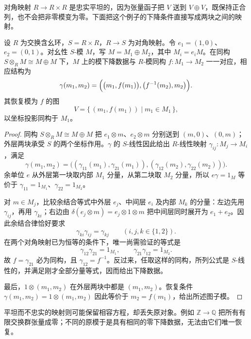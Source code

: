 对角映射 \(R\rightarrow R\times R\) 是忠实平坦的，因为张量函子把 \(V\) 送到 \(V\oplus V\)，既保持正合列，也不会把非零模变为零。下面把这个例子的下降条件直接写成两块之间的映射。

\begin{proposition}\label{b4:prop:A-product-descent-model}
	设 \(R\) 为交换含幺环，\(S=R\times R\)，\(R\rightarrow S\) 为对角映射。令 \(e_1=(1,0)\)、\(e_2=(0,1)\)。对幺性 \(S\)-模 \(M\)，写 \(M=M_1\oplus M_2\)，其中 \(M_i=e_iM\)。在同构 \(S\otimes_RM\cong M\oplus M\) 下，\(M\) 上的模下降数据与 \(R\)-模同构 \(f:M_1\rightarrow M_2\) 一一对应，相应结构为
	\[
		\gamma(m_1,m_2) =\Bigl(\bigl(m_1,f(m_1)\bigr), \bigl(f^{-1}(m_2),m_2\bigr)\Bigr).
	\]
	其恢复模为 \(f\) 的图
	\[
		V=\{\,(m_1,f(m_1))\mid m_1\in M_1\,\},
	\]
	以坐标投影同构于 \(M_1\)。
\end{proposition}
\begin{proof}
	同构 \(S\otimes_RM\cong M\oplus M\) 把 \(e_1\otimes m\)、\(e_2\otimes m\) 分别送到 \((m,0)\)、\((0,m)\)；外层两块承受 \(S\) 的两个坐标作用。\(\gamma\) 的 \(S\)-线性因此给出 \(R\)-线性映射 \(\gamma_{ij}:M_j\rightarrow M_i\)，满足
	\[
		\gamma(m_1,m_2) =\bigl((\gamma_{11}(m_1),\gamma_{21}(m_1)), (\gamma_{12}(m_2),\gamma_{22}(m_2))\bigr).
	\]
	余单位 \(e\) 从外层第一块取内部 \(M_1\) 分量，从第二块取 \(M_2\) 分量，所以 \(e\gamma=1_M\) 等价于 \(\gamma_{11}=1_{M_1}\)、\(\gamma_{22}=1_{M_2}\)。

	对 \(m\in M_j\)，比较余结合等式中外层 \(e_j\)、中间层 \(e_i\) 及内部 \(M_k\) 的分量：左边先用 \(\gamma_{ij}\)，再用 \(\gamma_{ki}\)；右边由 \(\delta(e_j\otimes m)=e_j\otimes1\otimes m\) 把中间层同时展开为 \(e_1+e_2\)。因此余结合律恰好要求
	\[
		\gamma_{ki}\gamma_{ij}=\gamma_{kj} \qquad(i,j,k\in\{1,2\}).
	\]
	在两个对角映射已为恒等的条件下，唯一尚需验证的等式是
	\[
		\gamma_{12}\gamma_{21}=1_{M_1},\qquad \gamma_{21}\gamma_{12}=1_{M_2}.
	\]
	故 \(f=\gamma_{21}\) 必为同构，且 \(\gamma_{12}=f^{-1}\)。反过来，任取这样的同构，所列公式是 \(S\)-线性的，并满足刚才全部分量等式，因而给出下降数据。

	最后，\(1\otimes(m_1,m_2)\) 在外层两块中都是 \((m_1,m_2)\)。恢复条件 \(\gamma(m_1,m_2)=1\otimes(m_1,m_2)\) 因此等价于 \(m_2=f(m_1)\)，给出所述图子模。
\end{proof}

平坦而不忠实的映射则可能保留相容方程，却丢失原对象。例如 \(\mathbb Z\rightarrow\mathbb Q\) 把所有有限交换群张量成零；不同的原模于是具有相同的零下降数据，无法由它们唯一恢复。
